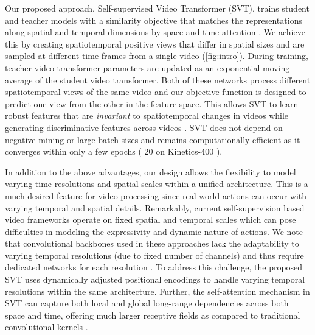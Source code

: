 \documentclass[10pt,twocolumn,letterpaper]{article}
\begin{document}
Our proposed approach, Self-supervised Video Transformer (SVT), trains student and teacher models with a similarity objective \cite{caron2021emerging} that matches the representations along spatial and temporal dimensions by space and time attention \cite{gberta_2021_ICML}. We achieve this by creating spatiotemporal positive views that differ in spatial sizes and are sampled at different time frames from a single video (\cref{fig:intro}). 
During training, teacher video transformer parameters are updated as an exponential moving average of the student video transformer. Both of these networks process different spatiotemporal views of the same video and our objective function is designed to predict one view from the other in the feature space. 
This allows SVT to learn robust features that are \emph{invariant} to spatiotemporal changes in videos while generating discriminative features across videos \cite{grill2020bootstrap}. SVT does not depend on negative mining or large batch sizes and remains computationally efficient as it converges within only a few epochs ( 20 on Kinetics-400 \cite{kinetics400}). 

In addition to the above advantages, our design allows the flexibility to model varying time-resolutions and spatial scales within a unified architecture. This is a much desired feature for video processing since real-world actions can occur with varying temporal and spatial details. Remarkably, current self-supervision  based video frameworks \cite{xiao2021modist,qian2020spatiotemporal} operate on fixed spatial and temporal scales which can pose difficulties in modeling the expressivity and dynamic nature of actions. We note that convolutional backbones used in these approaches lack the adaptability to varying temporal resolutions (due to fixed number of channels) and thus require dedicated networks for each resolution \cite{feichtenhofer2019slowfast, kahatapitiya2021coarse}. To address this challenge, the proposed SVT uses dynamically adjusted positional encodings to handle varying temporal resolutions within the same architecture.  Further, the self-attention mechanism in SVT can capture both local and global long-range dependencies across both space and time, offering much larger receptive fields as compared to traditional convolutional kernels \cite{naseer2021intriguing}. 
\end{document}
